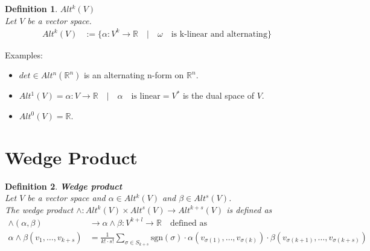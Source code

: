 \documentclass[11pt]{book} %
\newtheorem{definition}{Definition}[section]
\begin{document}
\begin{definition}{\textbf{$Alt^k(V)$}} \\
    Let \( V \) be a vector space. \\ 
    \begin{align*}
        Alt^k(V) &:= \{ \alpha : V^k \to \mathbb{R} \quad | \quad \omega \quad \text{is k-linear and alternating} \}
    \end{align*}
\end{definition}

Examples: 
\begin{itemize}
    \item $det \in Alt^n(\mathbb{R}^n)$ is an alternating n-form on $\mathbb{R}^n$.
    \item $Alt^1(V) = { \alpha : V \to \mathbb{R} \quad | \quad \alpha \quad \text{is linear} } = V^*$ is the dual space of \( V \).
    \item $Alt^0(V) = \mathbb{R}$.
\end{itemize}



\section{Wedge Product}

\begin{definition}{\textbf{Wedge product}} \\
    Let \( V \) be a vector space and \( \alpha \in Alt^k(V) \) and \( \beta \in Alt^s(V) \). \\
    The wedge product \( \wedge : Alt^k(V) \times Alt^s(V) \to Alt^{k+s}(V) \) is defined as
    \begin{align*}
        \wedge(\alpha, \beta) &\to \alpha \wedge \beta : V^{k+l} \to \mathbb{R} \quad \text{defined as} \\
        \alpha \wedge \beta(v_1, \ldots, v_{k+s}) &= \frac{1}{k! \cdot s!} \sum_{\sigma \in S_{k+s}} \text{sgn}(\sigma) \cdot \alpha(v_{\sigma(1)}, \ldots, v_{\sigma(k)}) \cdot \beta(v_{\sigma(k+1)}, \ldots, v_{\sigma(k+s)})
    \end{align*}
\end{definition}
\end{document}
